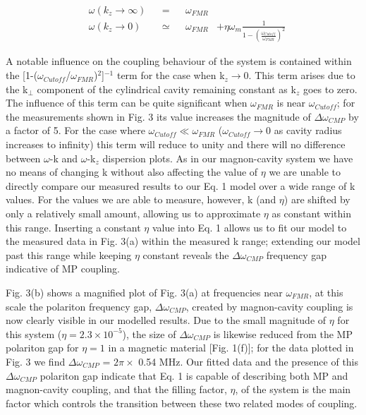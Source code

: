 \documentclass[prb,twocolumn,showpacs,preprintnumbers,amsmath,amssymb]{revtex4-1}
\begin{document}
\begin{subequations}
\begin{align}
&\omega(k_{z}\rightarrow\infty)& &=& &\omega_{FMR}& \\
&\omega(k_{z}\rightarrow0)& &\simeq& &\omega_{FMR}& + \eta\omega_{m}\frac{1}{1-(\frac{\omega_{Cutoff}}{\omega_{FMR}})^{2}}
\end{align}
\label{eq2}
\end{subequations}

A notable influence on the coupling behaviour of the system is contained within the [1-($\omega_{Cutoff}$/$\omega_{FMR}$)$^{2}$]$^{-1}$ term for the case when k$_{z}\rightarrow$0. This term arises due to the k$_{\perp}$ component of the cylindrical cavity remaining constant as k$_{z}$ goes to zero. The influence of this term can be quite significant when $\omega_{FMR}$ is near $\omega_{Cutoff}$; for the measurements shown in Fig. 3 its value increases the magnitude of $\Delta\omega_{CMP}$ by a factor of 5. For the case where $\omega_{Cutoff}\ll\omega_{FMR}$ ($\omega_{Cutoff}\rightarrow 0$ as cavity radius increases to infinity) this term will reduce to unity and there will no difference between $\omega$-k and $\omega$-k$_{z}$ dispersion plots. As in our magnon-cavity system we have no means of changing k without also affecting the value of $\eta$ we are unable to directly compare our measured results to our Eq. 1 model over a wide range of k values. For the values we are able to measure, however, k (and $\eta$) are shifted by only a relatively small amount, allowing us to approximate $\eta$ as constant within this range. Inserting a constant $\eta$ value into Eq. 1 allows us to fit our model to the measured data in Fig. 3(a) within the measured k range; extending our model past this range while keeping $\eta$ constant reveals the $\Delta\omega_{CMP}$ frequency gap indicative of MP coupling.


Fig. 3(b) shows a magnified plot of Fig. 3(a) at frequencies near $\omega_{FMR}$, at this scale the polariton frequency gap, $\Delta\omega_{CMP}$, created by magnon-cavity coupling is now clearly visible in our modelled results. Due to the small magnitude of $\eta$ for this system ($\eta=2.3\times 10^{-5}$), the size of $\Delta\omega_{CMP}$ is likewise reduced from the MP polariton gap for $\eta=1$ in a magnetic material [Fig. 1(f)]; for the data plotted in Fig. 3 we find $\Delta\omega_{CMP}$ = $2\pi\times$ 0.54 MHz. Our fitted data and the presence of this $\Delta\omega_{CMP}$ polariton gap indicate that Eq. 1 is capable of describing both MP and magnon-cavity coupling, and that the filling factor, $\eta$, of the system is the main factor which controls the transition between these two related modes of coupling.
\end{document}
